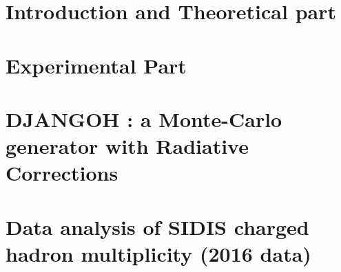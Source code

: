\pagestyle{scrheadings}

\part{Introduction and Theoretical part} %


\cleardoublepage %


\part{Experimental Part} %


\cleardoublepage %


\part{DJANGOH : a Monte-Carlo generator with Radiative Corrections} %


\cleardoublepage %


\part{Data analysis of SIDIS charged hadron multiplicity (2016 data)} %


